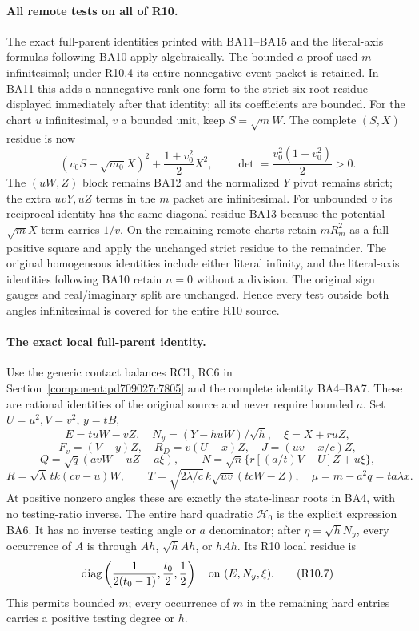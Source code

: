 \paragraph{All remote tests on all of R10.}
The exact full-parent identities printed with BA11--BA15 and the
literal-axis formulas following BA10 apply algebraically. The
bounded-$a$ proof used $m$ infinitesimal; under R10.4 its entire
nonnegative event packet is retained. In BA11 this adds a nonnegative
rank-one form to the strict six-root residue displayed immediately
after that identity; all its coefficients are bounded. For the chart
$u$ infinitesimal, $v$ a bounded unit, keep $S=\sqrt m W$.
The complete $(S,X)$ residue is now
\[
 (v_0S-\sqrt{m_0}X)^2+\frac{1+v_0^2}{2}X^2,
 \qquad \det=\frac{v_0^2(1+v_0^2)}2>0.
\tag{R10.6}
\]
The $(uW,Z)$ block remains BA12 and the normalized $Y$ pivot remains
strict; the extra $uvY,uZ$ terms in the $m$ packet are infinitesimal.
For unbounded $v$ its reciprocal identity has the same diagonal
residue BA13 because the potential $\sqrt m X$ term carries $1/v$.
On the remaining remote charts retain $mR_m^2$ as a full positive
square and apply the unchanged strict residue to the remainder.
The original homogeneous identities include either literal infinity,
and the literal-axis identities following BA10 retain $n=0$ without a division. The original
sign gauges and real/imaginary split are unchanged. Hence every test
outside both angles infinitesimal is covered for the entire R10 source.

\paragraph{The exact local full-parent identity.}
Use the generic contact balances RC1, RC6 in
Section~\ref{component:pd709027c7805} and the complete identity
BA4--BA7. These are rational identities of the original source and
never require bounded $a$. Set $U=u^2,V=v^2$, $y=tB$,
\[
 E=tuW-vZ,\quad N_y=(Y-huW)/\sqrt h,\quad \xi=X+ruZ,
\]
\[
 F_v=(V-y)Z,\quad R_D=v(U-x)Z,\quad J=(uv-x/c)Z,
\]
\[
 Q=\sqrt q(avW-uZ-a\xi),\qquad
 N=\sqrt n\{r[(a/t)V-U]Z+u\xi\},
\]
\[
 R=\sqrt\lambda\,tk(cv-u)W,\qquad
 T=\sqrt{2\lambda/c}\,k\sqrt{uv}(tcW-Z),\quad
 \mu=m-a^2q=ta\lambda x.
\]
At positive nonzero angles these are exactly the state-linear roots
in BA4, with no testing-ratio inverse. The entire hard quadratic
$\mathcal H_0$ is the explicit expression BA6. It has no inverse
testing angle or $a$ denominator; after $\eta=\sqrt hN_y$, every
occurrence of $A$ is through $Ah$, $\sqrt hAh$, or $hAh$.
Its R10 local residue is
\[
 \operatorname{diag}\left(\frac1{2(t_0-1)},\frac{t_0}2,\frac12\right)
 \quad\hbox{on }(E,N_y,\xi).
\tag{R10.7}
\]
This permits bounded $m$; every occurrence of $m$ in the remaining
hard entries carries a positive testing degree or $h$.

